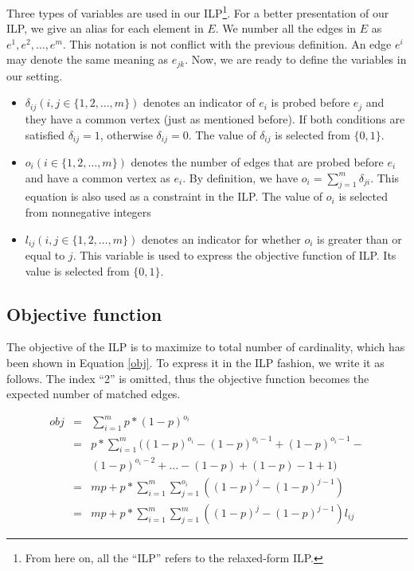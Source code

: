 \documentclass[letterpaper]{article}
\begin{document}
Three types of variables are used in our ILP\footnote{From here on, all the ``ILP'' refers to the relaxed-form ILP.}.
For a better presentation of our ILP, we give an alias for each element in $E$.
We number all the edges in $E$ as $e^1,e^2,\ldots,e^m$.
This notation is not conflict with the previous definition.
An edge $e^i$ may denote the same meaning as $e_{jk}$.
Now, we are ready to define the variables in our setting.
\begin{itemize}
	\item $\delta_{ij}(i,j\in\{1,2,\ldots,m\})$ denotes an indicator of $e_i$ is probed before $e_j$ and they have a common vertex (just as mentioned before). If both conditions are satisfied $\delta_{ij}=1$, otherwise $\delta_{ij}=0$. The value of $\delta_{ij}$ is selected from $\{0,1\}$.
	\item $o_i(i\in\{1,2,\ldots,m\})$ denotes the number of edges that are probed before $e_i$ and have a common vertex as $e_i$. By definition, we have $o_i=\sum_{j=1}^{m}\delta_{ji}$. This equation is also used as a constraint in the ILP. The value of $o_i$ is selected from nonnegative integers
	\item $l_{ij}(i,j\in\{1,2,\ldots,m\})$ denotes an indicator for whether $o_i$ is greater than or equal to $j$. This variable is used to express the objective function of ILP. Its value is selected from $\{0,1\}$.
\end{itemize}

\subsection{Objective function}

The objective of the ILP is to maximize to total number of cardinality, which has been shown in Equation \ref{obj}.
To express it in the ILP fashion, we write it as follows. The index ``2'' is omitted, thus the objective function becomes the expected number of matched edges.

\begin{eqnarray}
	obj&=&\sum_{i=1}^{m}p*(1-p)^{o_i}\\
	&= & p*\sum_{i=1}^{m} ((1-p)^{o_i}-(1-p)^{o_{i}-1}+(1-p)^{o_{i}-1}-\nonumber\\
	&&(1-p)^{o_{i}-2}+\ldots-(1-p)+(1-p)-1+1)\\
	&=& mp+p*\sum_{i=1}^{m}\sum_{j=1}^{o_i}((1-p)^j-(1-p)^{j-1})\\
	&=& mp+p*\sum_{i=1}^{m}\sum_{j=1}^{m}((1-p)^j-(1-p)^{j-1})l_{ij}\label{fobj}
\end{eqnarray}
\end{document}
